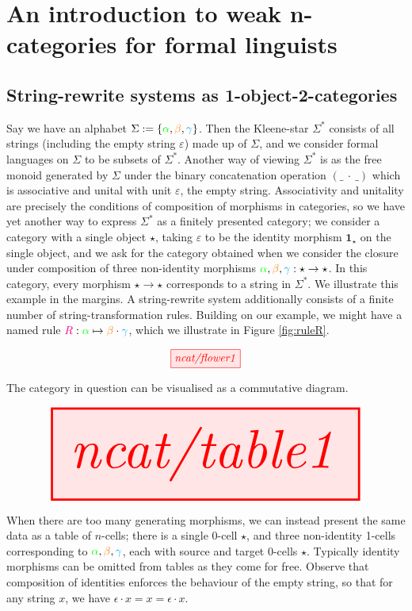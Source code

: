 \section{An introduction to weak n-categories for formal linguists}

\subsection{String-rewrite systems as 1-object-2-categories}

Say we have an alphabet $\Sigma := \{\textcolor{green}{\alpha}, \textcolor{orange}{\beta}, \textcolor{cyan}{\gamma}\}$. Then the Kleene-star $\Sigma^*$ consists of all strings (including the empty string $\varepsilon$) made up of $\Sigma$, and we consider formal languages on $\Sigma$ to be subsets of $\Sigma^*$. Another way of viewing $\Sigma^*$ is as the free monoid generated by $\Sigma$ under the binary concatenation operation $(\_ \ \cdot \ \_)$ which is associative and unital with unit $\varepsilon$, the empty string. Associativity and unitality are precisely the conditions of composition of morphisms in categories, so we have yet another way to express $\Sigma^*$ as a finitely presented category; we consider a category with a single object $\star$, taking $\varepsilon$ to be the identity morphism $\textbf{1}_\star$ on the single object, and we ask for the category obtained when we consider the closure under composition of three non-identity morphisms $\textcolor{green}{\alpha}, \textcolor{orange}{\beta}, \textcolor{cyan}{\gamma}: \star \rightarrow \star$. In this category, every morphism $\star \rightarrow \star$ corresponds to a string in $\Sigma^*$. We illustrate this example in the margins. A string-rewrite system additionally consists of a finite number of string-transformation rules. Building on our example, we might have a named rule $\textcolor{magenta}{R}: \textcolor{green}{\alpha} \mapsto \textcolor{orange}{\beta} \cdot \textcolor{cyan}{\gamma}$, which we illustrate in Figure \ref{fig:ruleR}.\\

\begin{marginfigure}
\centering
\[\tikzfig{ncat/flower1}\]
\caption{The category in question can be visualised as a commutative diagram.}
\end{marginfigure}

\begin{marginfigure}
\centering
\[\resizebox{\textwidth}{!}{\tikzfig{ncat/table1}}\]
\caption{When there are too many generating morphisms, we can instead present the same data as a table of $n$-cells; there is a single 0-cell $\star$, and three non-identity 1-cells corresponding to $\textcolor{green}{\alpha}, \textcolor{orange}{\beta}, \textcolor{cyan}{\gamma}$, each with source and target 0-cells $\star$. Typically identity morphisms can be omitted from tables as they come for free. Observe that composition of identities enforces the behaviour of the empty string, so that for any string $x$, we have $\epsilon \cdot x = x = \epsilon \cdot x$.}
\end{marginfigure}

